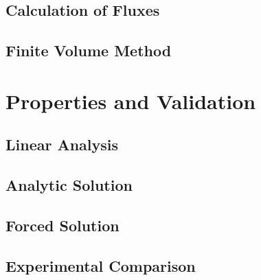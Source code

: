 \documentclass[pdf]{beamer}
\begin{document}
\subsection{Calculation of Fluxes}
\begin{frame}
\end{frame}
\subsection{Finite Volume Method}
\begin{frame}
\end{frame}

\section{Properties and Validation}
\begin{frame}
\end{frame}
\subsection{Linear Analysis}
\begin{frame}
\end{frame}
\subsection{Analytic Solution}
\begin{frame}
\end{frame}
\subsection{Forced Solution}
\begin{frame}
\end{frame}
\subsection{Experimental Comparison}
\begin{frame}
\end{frame}
\end{document}
